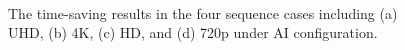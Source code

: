 \documentclass[lettersize,journal]{IEEEtran}
\begin{document}
\begin{figure}[!b]
	\centering
    \vspace{-6pt}
	 \hspace{2pt}
	 \vspace{-6pt} \\
	 \hspace{2pt}
	\caption{The time-saving results in the four sequence cases including (a) UHD, (b) 4K, (c) HD, and (d) 720p under AI configuration.}
	\label{Time curves}
\end{figure}
\end{document}

